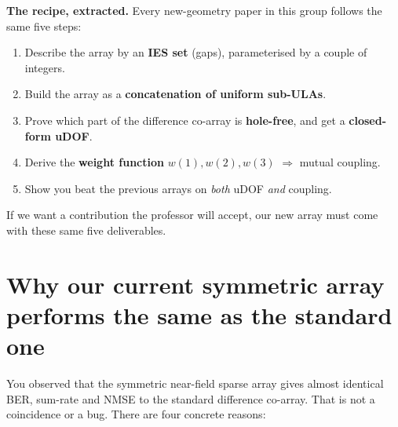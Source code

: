 \documentclass[11pt]{article}
\begin{document}
\begin{keybox}
\textbf{The recipe, extracted.} Every new-geometry paper in this group follows the same five steps:
\begin{enumerate}
\item Describe the array by an \textbf{IES set} (gaps), parameterised by a couple of integers.
\item Build the array as a \textbf{concatenation of uniform sub-ULAs}.
\item Prove which part of the difference co-array is \textbf{hole-free}, and get a
\textbf{closed-form uDOF}.
\item Derive the \textbf{weight function} $w(1),w(2),w(3)$ $\Rightarrow$ mutual coupling.
\item Show you beat the previous arrays on \emph{both} uDOF \emph{and} coupling.
\end{enumerate}
If we want a contribution the professor will accept, our new array must come with these same five
deliverables.
\end{keybox}

\section{Why our current symmetric array performs the same as the standard one}

You observed that the symmetric near-field sparse array gives almost identical BER, sum-rate and
NMSE to the standard difference co-array. That is not a coincidence or a bug. There are four
concrete reasons:
\end{document}

